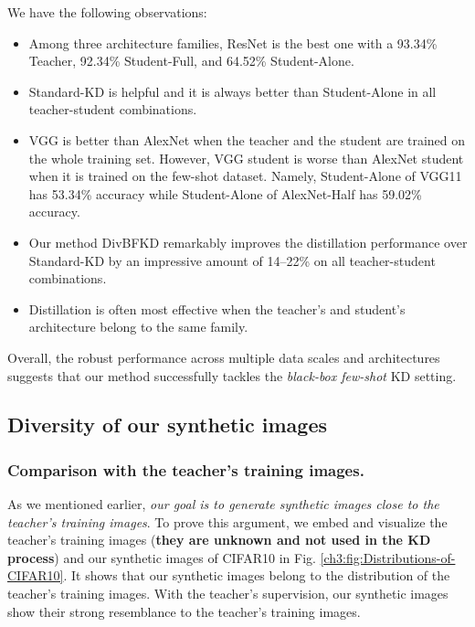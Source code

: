 \begin{foldable}
We have the following observations:
\begin{itemize}
    \item Among three architecture families, ResNet is the best one with a 93.34\% Teacher, 92.34\% Student-Full, and 64.52\% Student-Alone.
    \item Standard-KD is helpful and it is always better than Student-Alone in all teacher-student combinations.
    \item VGG is better than AlexNet when the teacher and the student are trained on the whole training set. However, VGG student is worse than AlexNet student when it is trained on the few-shot dataset. Namely, Student-Alone of VGG11 has 53.34\% accuracy while Student-Alone of AlexNet-Half has 59.02\% accuracy.
    \item Our method DivBFKD remarkably improves the distillation performance over Standard-KD by an impressive amount of 14--22\% on all teacher-student combinations.
    \item Distillation is often most effective when the teacher's and student's architecture belong to the same family.
\end{itemize}
\end{foldable}

\begin{foldable}
Overall, the robust performance across multiple data scales and architectures suggests that our method successfully tackles the \textit{black-box few-shot} KD setting.
\end{foldable}


\subsection{Diversity of our synthetic images}

\subsubsection{Comparison with the teacher's training images.}
\begin{foldable}
As we mentioned earlier, \textit{our goal is to generate synthetic images close to the teacher's training images}.
To prove this argument, we embed and visualize the teacher's training images (\textbf{they are unknown and not used in the KD process}) and our synthetic images of CIFAR10 in Fig. \ref{ch3:fig:Distributions-of-CIFAR10}.
It shows that our synthetic images belong to the distribution of the teacher's training images.
With the teacher's supervision, our synthetic images show their strong resemblance to the teacher's training images.
\end{foldable}

